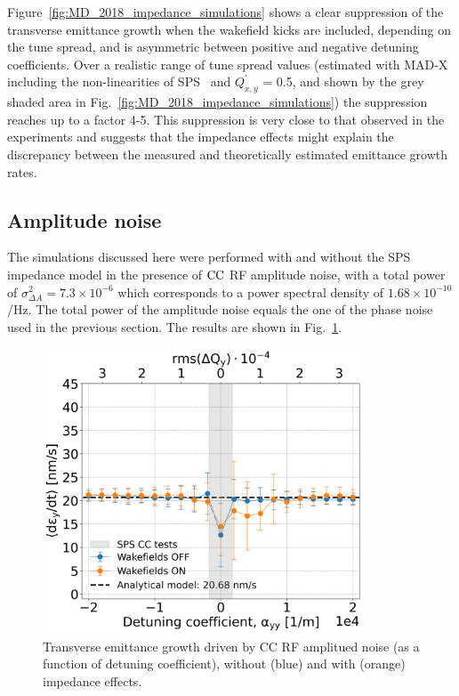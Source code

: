 Figure~\ref{fig:MD_2018_impedance_simulations} shows a clear suppression of the transverse emittance growth when the wakefield kicks are included, depending on the tune spread, and is asymmetric between positive and negative detuning coefficients. Over a realistic range of tune spread values (estimated with MAD-X~\cite{madx} including the non-linearities of SPS~\cite{Carlà:2664976, Alekou:2640326} and $Q^\prime_{x,y}$ = 0.5, and shown by the grey shaded area in Fig.~\ref{fig:MD_2018_impedance_simulations}) the suppression reaches up to a factor 4-5. This suppression is very close to that observed in the experiments and suggests that the impedance effects might explain the discrepancy between the measured and theoretically estimated emittance growth rates.


\subsection{Amplitude noise}\label{subsec:amplitude_noise}
The simulations discussed here were performed with and without the SPS impedance model in the presence of ${\mathrm{CC}}$ RF amplitude noise, with a total power of $\sigma_{\Delta A}^2=7.3\times 10^{-6}$ which corresponds to a power spectral density of $1.68 \times 10^{-10}$/Hz. The total power of the amplitude noise equals the one of the phase noise used in the previous section. The results are shown in Fig.~\ref{fig:study_1_2018_paramters_AN}.

\begin{figure}[!h] %
    \centering         
    \includegraphics[width=0.85\textwidth]{images/Ch7/deyRates_final_2018_AN_sps_270GeV_AN1e-8_400MHz_y-plane_QpxQpy5e-1_6D_Nb5e5_intensity3e10_ayyScan_wakesON_vs_OFF_vs_TuneSpreadvsExpectedSPS.png}
        \caption{Transverse emittance growth driven by CC RF amplitued noise (as a function of detuning coefficient), without (blue) and with (orange) impedance effects.}
        \label{fig:study_1_2018_paramters_AN}
 \end{figure}

